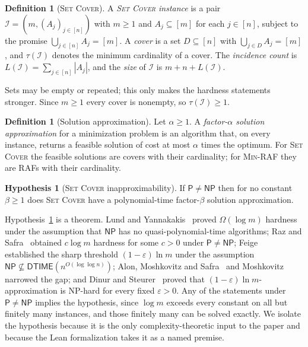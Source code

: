\documentclass[11pt,a4paper]{article}
\theoremstyle{plain}
\theoremstyle{definition}
\newtheorem{definition}[theorem]{Definition}
\newtheorem{hypothesis}[theorem]{Hypothesis}
\theoremstyle{remark}
\newcommand{\cI}{\mathcal{I}}
\newcommand{\tauI}{\tau(\cI)}
\newcommand{\SetCover}{\textup{\textsc{Set Cover}}}
\newcommand{\MinRAF}{\textup{\textsc{Min-RAF}}}
\newcommand{\NP}{\mathsf{NP}}
\newcommand{\Ptime}{\mathsf{P}}
\begin{document}
\begin{definition}[\SetCover]\label{def:setcover}
A \emph{\SetCover{} instance} is a pair $\cI=(m,(A_j)_{j\in[n]})$ with $m\ge 1$ and $A_j\subseteq[m]$ for each $j\in[n]$, subject to the promise $\bigcup_{j\in[n]}A_j=[m]$. A \emph{cover} is a set $D\subseteq[n]$ with $\bigcup_{j\in D}A_j=[m]$, and $\tauI$ denotes the minimum cardinality of a cover. The \emph{incidence count} is $L(\cI)=\sum_{j\in[n]}|A_j|$, and the \emph{size} of $\cI$ is $m+n+L(\cI)$.
\end{definition}

Sets may be empty or repeated; this only makes the hardness statements stronger. Since $m\ge 1$ every cover is nonempty, so $\tauI\ge 1$.

\begin{definition}[Solution approximation]\label{def:approx}
Let $\alpha\ge 1$. A \emph{factor-$\alpha$ solution approximation} for a minimization problem is an algorithm that, on every instance, returns a feasible solution of cost at most $\alpha$ times the optimum. For \SetCover{} the feasible solutions are covers with their cardinality; for \MinRAF{} they are RAFs with their cardinality.
\end{definition}

\begin{hypothesis}[\SetCover{} inapproximability]\label{hyp:setcover}
If $\Ptime\ne\NP$ then for no constant $\beta\ge 1$ does \SetCover{} have a polynomial-time factor-$\beta$ solution approximation.
\end{hypothesis}

Hypothesis~\ref{hyp:setcover} is a theorem. Lund and Yannakakis~\cite{lund1994hardness} proved $\Omega(\log m)$ hardness under the assumption that $\NP$ has no quasi-polynomial-time algorithms; Raz and Safra~\cite{razsafra1997subconstant} obtained $c\log m$ hardness for some $c>0$ under $\Ptime\ne\NP$; Feige~\cite{feige1998threshold} established the sharp threshold $(1-\varepsilon)\ln m$ under the assumption $\NP\not\subseteq\mathsf{DTIME}(n^{O(\log\log n)})$; Alon, Moshkovitz and Safra~\cite{alon2006algorithmic} and Moshkovitz~\cite{moshkovitz2015projection} narrowed the gap; and Dinur and Steurer~\cite{dinur2014analytical} proved that $(1-\varepsilon)\ln m$-approximation is NP-hard for every fixed $\varepsilon>0$. Any of the statements under $\Ptime\ne\NP$ implies the hypothesis, since $\log m$ exceeds every constant on all but finitely many instances, and those finitely many can be solved exactly. We isolate the hypothesis because it is the only complexity-theoretic input to the paper and because the Lean formalization takes it as a named premise.
\end{document}
